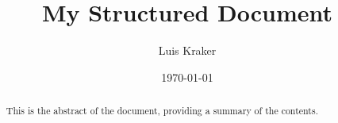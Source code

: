 \documentclass[12pt]{report}
\begin{document}
\title{My Structured Document}
\author{Luis Kraker}
\date{\today}

\maketitle

\begin{abstract}
    This is the abstract of the document, providing a summary of the contents.
\end{abstract}

\tableofcontents
\newpage





\newpage


\appendix



\end{document}

